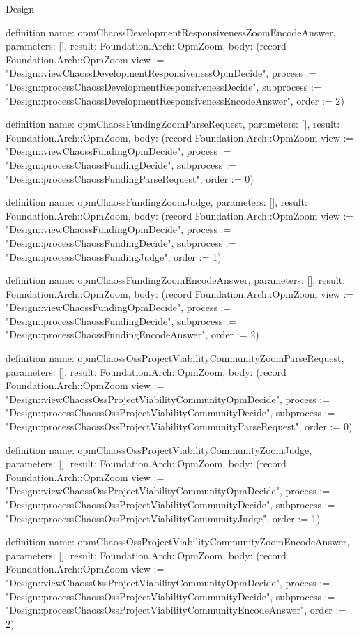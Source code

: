 \begin{lexlean}{Design}
\begin{semanticmodule}
definition{
  name: opmChaossDevelopmentResponsivenessZoomEncodeAnswer,
  parameters: [],
  result: Foundation.Arch::OpmZoom,
  body: (record Foundation.Arch::OpmZoom {view := "Design::viewChaossDevelopmentResponsivenessOpmDecide", process := "Design::processChaossDevelopmentResponsivenessDecide", subprocess := "Design::processChaossDevelopmentResponsivenessEncodeAnswer", order := 2})
}

definition{
  name: opmChaossFundingZoomParseRequest,
  parameters: [],
  result: Foundation.Arch::OpmZoom,
  body: (record Foundation.Arch::OpmZoom {view := "Design::viewChaossFundingOpmDecide", process := "Design::processChaossFundingDecide", subprocess := "Design::processChaossFundingParseRequest", order := 0})
}

definition{
  name: opmChaossFundingZoomJudge,
  parameters: [],
  result: Foundation.Arch::OpmZoom,
  body: (record Foundation.Arch::OpmZoom {view := "Design::viewChaossFundingOpmDecide", process := "Design::processChaossFundingDecide", subprocess := "Design::processChaossFundingJudge", order := 1})
}

definition{
  name: opmChaossFundingZoomEncodeAnswer,
  parameters: [],
  result: Foundation.Arch::OpmZoom,
  body: (record Foundation.Arch::OpmZoom {view := "Design::viewChaossFundingOpmDecide", process := "Design::processChaossFundingDecide", subprocess := "Design::processChaossFundingEncodeAnswer", order := 2})
}

definition{
  name: opmChaossOssProjectViabilityCommunityZoomParseRequest,
  parameters: [],
  result: Foundation.Arch::OpmZoom,
  body: (record Foundation.Arch::OpmZoom {view := "Design::viewChaossOssProjectViabilityCommunityOpmDecide", process := "Design::processChaossOssProjectViabilityCommunityDecide", subprocess := "Design::processChaossOssProjectViabilityCommunityParseRequest", order := 0})
}

definition{
  name: opmChaossOssProjectViabilityCommunityZoomJudge,
  parameters: [],
  result: Foundation.Arch::OpmZoom,
  body: (record Foundation.Arch::OpmZoom {view := "Design::viewChaossOssProjectViabilityCommunityOpmDecide", process := "Design::processChaossOssProjectViabilityCommunityDecide", subprocess := "Design::processChaossOssProjectViabilityCommunityJudge", order := 1})
}

definition{
  name: opmChaossOssProjectViabilityCommunityZoomEncodeAnswer,
  parameters: [],
  result: Foundation.Arch::OpmZoom,
  body: (record Foundation.Arch::OpmZoom {view := "Design::viewChaossOssProjectViabilityCommunityOpmDecide", process := "Design::processChaossOssProjectViabilityCommunityDecide", subprocess := "Design::processChaossOssProjectViabilityCommunityEncodeAnswer", order := 2})
}


\end{semanticmodule}
\end{lexlean}
